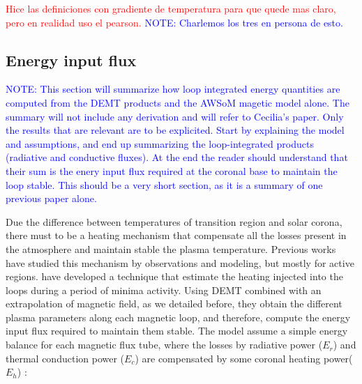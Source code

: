\documentclass[namedreferences]{solarphysics}
\def\diego#1{\textcolor{red}{#1}}
\def\notebyalbert#1{\textcolor{blue}{NOTE: #1}}
\begin{document}
\begin{article}
\begin{itemize}
\end{itemize}
\diego{Hice las definiciones con gradiente de temperatura para que quede mas claro, pero en realidad uso el pearson.} \notebyalbert{Charlemos los tres en persona de esto.}

\subsection{{Energy input flux}}\label{energia} 

\noindent\notebyalbert{This section will summarize how loop integrated energy quantities are computed from the DEMT products and the AWSoM magetic model alone. The summary will not include any derivation and will refer to Cecilia's paper. Only the results that are relevant are to be explicited. Start by explaining the model and assumptions, and end up summarizing the loop-integrated products (radiative and conductive fluxes). At the end the reader should understand that their sum is the enery input flux required at the coronal base to maintain the loop stable. This should be a very short section, as it is a summary of one previous paper alone.}


Due the difference between temperatures of transition region and solar corona, there must to be a heating mechanism that compensate all the losses present in the atmosphere and maintain stable the plasma temperature. Previous works have studied this mechanism by observations and modeling, but mostly for active regions. \citet{maccormack_2017} have developed a technique that estimate the heating injected into the loops during a period of minima activity. Using DEMT combined with an extrapolation of magnetic field, as we detailed before, they obtain the different plasma parameters along each magnetic loop, and therefore, compute the energy input flux required to maintain them stable.
The model assume a simple energy balance for each magnetic flux tube, where the losses by radiative power ($E_r$) and thermal conduction power ($E_c$) are compensated by some coronal heating power($E_h$) \citep{aschwanden_2004}:


\end{article}
\end{document}
